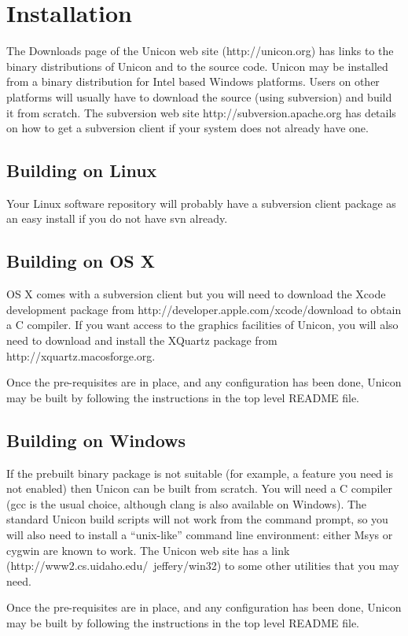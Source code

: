 \chapter{Installation}

The Downloads page of the Unicon web site (http://unicon.org) has
links to the binary distributions of Unicon and to the source code.
Unicon may be installed from a binary distribution for Intel based
Windows platforms. Users on other platforms will usually have to
download the source (using subversion) and build it from scratch.
The subversion web site http://subversion.apache.org has details on
how to get a subversion client if your system does not already have one.

\section{Building on Linux}

Your Linux software repository will probably have a
subversion client package as an easy install if you
do not have svn already.

\section{Building on OS X}

OS X comes with a subversion client but you will need to download the
Xcode development package from http://developer.apple.com/xcode/download 
to obtain a C compiler.  If you want access to the graphics
facilities of Unicon, you will also need to download and install the
XQuartz package from http://xquartz.macosforge.org.

Once the pre-requisites are in place, and any configuration has been
done, Unicon may be built by following the instructions in the top
level README file.

\section{Building on Windows}

If the prebuilt binary package is not suitable (for example, a feature
you need is not enabled) then Unicon can be built from scratch. You
will need a C compiler (gcc is the usual choice, although clang is also
available on Windows). The standard Unicon build scripts will not
work from the command prompt, so you will also need to install a
``unix-like'' command line environment: either Msys or cygwin are
known to work. The Unicon web site has a link
(http://www2.cs.uidaho.edu/~jeffery/win32) to some other utilities
that you may need.

Once the pre-requisites are in place, and any configuration has been
done, Unicon may be built by following the instructions in the top
level README file.
